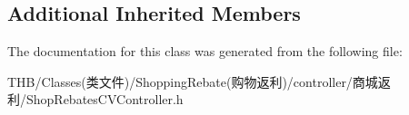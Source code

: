 \subsection*{Additional Inherited Members}


The documentation for this class was generated from the following file\+:\begin{DoxyCompactItemize}
\item 
T\+H\+B/\+Classes(类文件)/\+Shopping\+Rebate(购物返利)/controller/商城返利/Shop\+Rebates\+C\+V\+Controller.\+h\end{DoxyCompactItemize}
